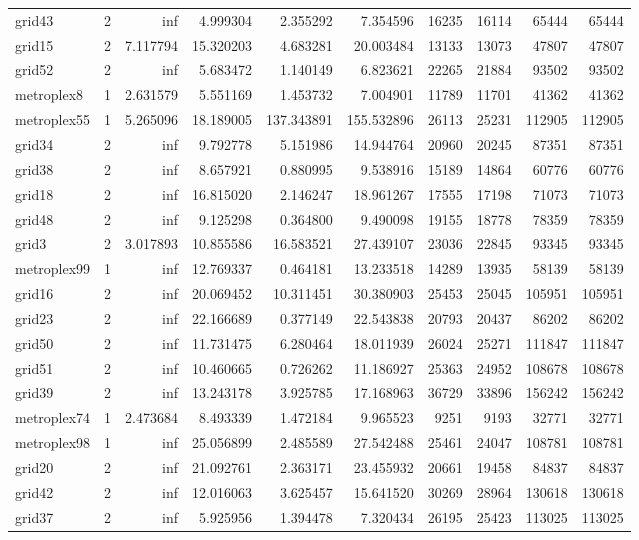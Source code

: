 \begin{longtable}{|l|r|r|r|r|r|r|r|r|r|}
grid43 & 2 & inf & 4.999304 & 2.355292 & 7.354596 & 16235 & 16114 & 65444 & 65444 \\
grid15 & 2 & 7.117794 & 15.320203 & 4.683281 & 20.003484 & 13133 & 13073 & 47807 & 47807 \\
grid52 & 2 & inf & 5.683472 & 1.140149 & 6.823621 & 22265 & 21884 & 93502 & 93502 \\
metroplex8 & 1 & 2.631579 & 5.551169 & 1.453732 & 7.004901 & 11789 & 11701 & 41362 & 41362 \\
metroplex55 & 1 & 5.265096 & 18.189005 & 137.343891 & 155.532896 & 26113 & 25231 & 112905 & 112905 \\
grid34 & 2 & inf & 9.792778 & 5.151986 & 14.944764 & 20960 & 20245 & 87351 & 87351 \\
grid38 & 2 & inf & 8.657921 & 0.880995 & 9.538916 & 15189 & 14864 & 60776 & 60776 \\
grid18 & 2 & inf & 16.815020 & 2.146247 & 18.961267 & 17555 & 17198 & 71073 & 71073 \\
grid48 & 2 & inf & 9.125298 & 0.364800 & 9.490098 & 19155 & 18778 & 78359 & 78359 \\
grid3 & 2 & 3.017893 & 10.855586 & 16.583521 & 27.439107 & 23036 & 22845 & 93345 & 93345 \\
metroplex99 & 1 & inf & 12.769337 & 0.464181 & 13.233518 & 14289 & 13935 & 58139 & 58139 \\
grid16 & 2 & inf & 20.069452 & 10.311451 & 30.380903 & 25453 & 25045 & 105951 & 105951 \\
grid23 & 2 & inf & 22.166689 & 0.377149 & 22.543838 & 20793 & 20437 & 86202 & 86202 \\
grid50 & 2 & inf & 11.731475 & 6.280464 & 18.011939 & 26024 & 25271 & 111847 & 111847 \\
grid51 & 2 & inf & 10.460665 & 0.726262 & 11.186927 & 25363 & 24952 & 108678 & 108678 \\
grid39 & 2 & inf & 13.243178 & 3.925785 & 17.168963 & 36729 & 33896 & 156242 & 156242 \\
metroplex74 & 1 & 2.473684 & 8.493339 & 1.472184 & 9.965523 & 9251 & 9193 & 32771 & 32771 \\
metroplex98 & 1 & inf & 25.056899 & 2.485589 & 27.542488 & 25461 & 24047 & 108781 & 108781 \\
grid20 & 2 & inf & 21.092761 & 2.363171 & 23.455932 & 20661 & 19458 & 84837 & 84837 \\
grid42 & 2 & inf & 12.016063 & 3.625457 & 15.641520 & 30269 & 28964 & 130618 & 130618 \\
grid37 & 2 & inf & 5.925956 & 1.394478 & 7.320434 & 26195 & 25423 & 113025 & 113025 \\

\end{longtable}
